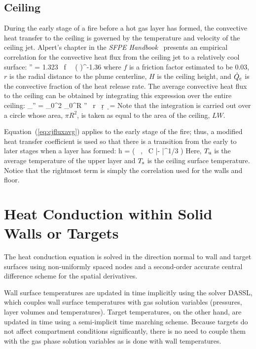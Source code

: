 \documentclass[12pt,twoside]{book}
\begin{document}
\subsection{Ceiling}

During the early stage of a fire before a hot gas layer has formed, the convective heat transfer to the ceiling is governed by the temperature and velocity of the ceiling jet. Alpert's chapter in the \emph{SFPE Handbook}~\cite{Alpert:SFPE} presents an empirical correlation for the convective heat flux from the ceiling jet to a relatively cool surface:
\be
   \dqc'' = 1.323 \, f \,  \, \left(  \right)^{-1.36}  \label{eq:cjflux}
\ee
where $f$ is a friction factor estimated to be 0.03, $r$ is the radial distance to the plume centerline, $H$ is the ceiling height, and $\dot{Q}_{\mathrm{c}}$ is the convective fraction of the heat release rate. The average convective heat flux to the ceiling can be obtained by integrating this expression over the entire ceiling:
\be
   \dq_{}'' =  \int_0^{2\pi} \int_0^R \dqc'' \, r \, \d r \, \d\theta =  \label{eq:cjfluxavg}
\ee
Note that the integration is carried out over a circle whose area, $\pi R^2$, is taken as equal to the area of the ceiling, $LW$.

Equation~(\ref{eq:cjfluxavg}) applies to the early stage of the fire; thus, a modified heat transfer coefficient is used so that there is a transition from the early to later stages when a layer has formed:
\be
   h = \max \left(  \, , \, C {|\Tu - \Tw|}^{1/3} \right)
\ee
Here, $T\sb{\mathrm{u}}$ is the average temperature of the upper layer and $T\sb{\mathrm{s}}$ is the ceiling surface temperature. Notice that the rightmost term is simply the correlation used for the walls and floor.



\section{Heat Conduction within Solid Walls or Targets}

The heat conduction equation is solved in the direction normal to wall and target surfaces using non-uniformly spaced nodes and a second-order accurate central difference scheme for the spatial derivatives.

Wall surface temperatures are updated in time implicitly using the solver DASSL, which couples wall surface temperatures with gas solution variables (pressures, layer volumes and temperatures). Target temperatures, on the other hand, are updated in time using a semi-implicit time marching scheme. Because targets do not affect compartment conditions significantly, there is no need to couple them with the gas phase solution variables as is done with wall temperatures.
\end{document}
